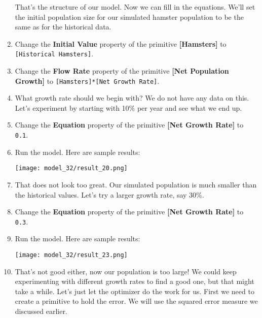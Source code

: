 \documentclass[]{memoir}
\makeatletter
\def\maxwidth{\ifdim\Gin@nat@width>\linewidth\linewidth
\else\Gin@nat@width\fi}
\let\Oldincludegraphics\includegraphics
\renewcommand{\includegraphics}[1]{\Oldincludegraphics[width=\maxwidth]{#1}}
\newcommand{\p}[1]{\textbf{{[}#1{]}}}
\newcommand{\e}[1]{\texttt{#1}}
\renewcommand{\a}[1]{\textbf{#1}}
\makeatother
\begin{document}
\begin{oframed}
\begin{enumerate}
That's the structure of our model. Now we can fill in the equations. We'll set the initial population size for our simulated hamster population to be the same as for the historical data.


\item  Change the \a{Initial Value} property of the primitive \p{Hamsters} to \e{[Historical Hamsters]}.
\item  Change the \a{Flow Rate} property of the primitive \p{Net Population Growth} to \e{[Hamsters]*[Net Growth Rate]}.
\item 

What growth rate should we begin with? We do not have any data on this. Let's experiment by starting with 10\% per year and see what we end up.


\item  Change the \a{Equation} property of the primitive \p{Net Growth Rate} to \e{0.1}.
\item Run the model. Here are sample results:\par \begin{minipage}{\linewidth}  \centering \texttt{[image: model\_32/result\_20.png]}
\end{minipage}
\item 

That does not look too great. Our simulated population is much smaller than the historical values. Let's try a larger growth rate, say 30\%.


\item  Change the \a{Equation} property of the primitive \p{Net Growth Rate} to \e{0.3}.
\item Run the model. Here are sample results:\par \begin{minipage}{\linewidth}  \centering \texttt{[image: model\_32/result\_23.png]}
\end{minipage}
\item 

That's not good either, now our population is too large! We could keep experimenting with different growth rates to find a good one, but that might take a while. Let's just let the optimizer do the work for us. First we need to create a primitive to hold the error. We will use the squared error measure we discussed earlier.



\end{enumerate}
\end{oframed}
\end{document}
